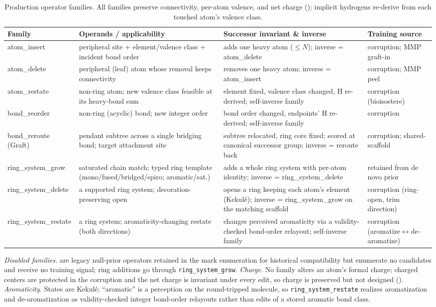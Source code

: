 \begin{table}[h]
\centering
\caption{Production operator families. All families preserve connectivity, per-atom valence, and net
charge (); implicit hydrogens re-derive from each touched atom's valence class.}
\label{tab:operators}
\footnotesize
\renewcommand{\arraystretch}{1.15}
\begin{tabularx}{\textwidth}{@{}l Y Y l@{}}
\toprule
Family & Operands / applicability & Successor invariant \& inverse & Training source \\
\midrule
atom\_insert & peripheral site + element/valence class + incident bond order & adds one heavy atom
($\le N$); inverse = atom\_delete & corruption; MMP graft-in \\
atom\_delete & peripheral (leaf) atom whose removal keeps connectivity & removes one heavy atom; inverse =
atom\_insert & corruption; MMP peel \\
atom\_restate & non-ring atom; new valence class feasible at its heavy-bond sum & element fixed, valence
class changed, H re-derived; self-inverse family & corruption (bioisostere) \\
bond\_reorder & non-ring (acyclic) bond; new integer order & bond order changed, endpoints' H re-derived;
self-inverse family & corruption \\
bond\_reroute (Graft) & pendant subtree across a single bridging bond; target attachment site & subtree
relocated, ring core fixed; scored at canonical successor group; inverse = reroute back & corruption;
shared-scaffold \\
ring\_system\_grow & saturated chain match; typed ring template (mono/fused/bridged/spiro; aromatic/sat.)
& adds a whole ring system with per-atom identity; inverse = ring\_system\_delete & retained from de novo
prior \\
ring\_system\_delete & a supported ring system; decoration-preserving open & opens a ring keeping each
atom's element (Kekul\'e); inverse = ring\_system\_grow on the matching scaffold & corruption (ring-open,
trim direction) \\
ring\_system\_restate & a ring system; aromaticity-changing restate (both directions) & changes perceived
aromaticity via a validity-checked bond-order relayout; self-inverse family & corruption
(aromatize$\leftrightarrow$de-aromatize) \\
\bottomrule
\end{tabularx}
\end{table}

\emph{Disabled families.}  are legacy null-prior operators retained in the
mark enumeration for historical compatibility but enumerate no candidates and receive no training signal;
ring additions go through \texttt{ring\_system\_grow}. \emph{Charge.} No family alters an atom's formal
charge; charged centers are protected in the corruption and the net charge is invariant under every edit,
so charge is preserved but not designed (). \emph{Aromaticity.} States are Kekul\'e;
``aromatic'' is a perception on the round-tripped molecule, so \texttt{ring\_system\_restate} realizes
aromatization and de-aromatization as validity-checked integer bond-order relayouts rather than edits of a
stored aromatic bond class.
